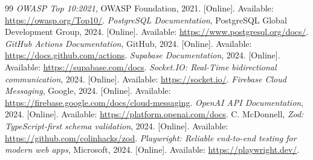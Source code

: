 \documentclass[conference,a4paper]{IEEEtran}
\begin{document}
\begin{thebibliography}{99}
 \emph{OWASP Top 10:2021}, OWASP Foundation, 2021. [Online]. Available: \url{https://owasp.org/Top10/}.
 \emph{PostgreSQL Documentation}, PostgreSQL Global Development Group, 2024. [Online]. Available: \url{https://www.postgresql.org/docs/}.
 \emph{GitHub Actions Documentation}, GitHub, 2024. [Online]. Available: \url{https://docs.github.com/actions}.
 \emph{Supabase Documentation}, 2024. [Online]. Available: \url{https://supabase.com/docs}.
 \emph{Socket.IO: Real-Time bidirectional communication}, 2024. [Online]. Available: \url{https://socket.io/}.
 \emph{Firebase Cloud Messaging}, Google, 2024. [Online]. Available: \url{https://firebase.google.com/docs/cloud-messaging}.
 \emph{OpenAI API Documentation}, 2024. [Online]. Available: \url{https://platform.openai.com/docs}.
 C. McDonnell, \emph{Zod: TypeScript-first schema validation}, 2024. [Online]. Available: \url{https://github.com/colinhacks/zod}.
 \emph{Playwright: Reliable end-to-end testing for modern web apps}, Microsoft, 2024. [Online]. Available: \url{https://playwright.dev/}.
\end{thebibliography}


\end{document}
